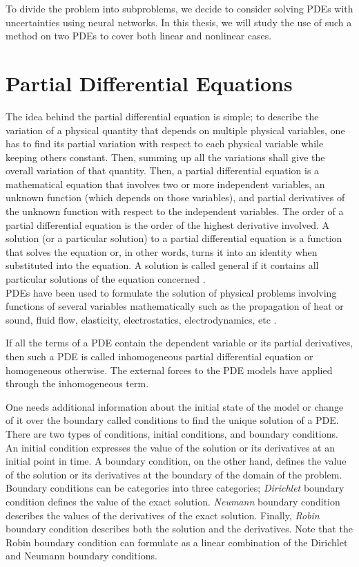 To divide the problem into subproblems, we decide to consider solving PDEs with uncertainties using neural networks. In this thesis, we will study the use of such a method on two PDEs to cover both linear and nonlinear cases.

\section{Partial Differential Equations}
\label{sec:PDE}
The idea behind the partial differential equation is simple; to describe the variation of a physical quantity that depends on multiple physical variables, one has to find its partial variation with respect to each physical variable while keeping others constant. Then, summing up all the variations shall give the overall variation of that quantity. Then, a partial differential equation is a mathematical equation that involves two or more independent variables, an unknown function (which depends on those variables), and partial derivatives of the unknown function with respect to the independent variables. The order of a partial differential equation is the order of the highest derivative involved. A solution (or a particular solution) to a partial differential equation is a function that solves the equation or, in other words, turns it into an identity when substituted into the equation. A solution is called general if it contains all particular solutions of the equation concerned \cite{stavroulakis1999partial}.\\
PDEs have been used  to formulate the solution of physical problems involving functions of several variables mathematically such as the propagation of heat or sound, fluid flow, elasticity, electrostatics, electrodynamics, etc \cite{stavroulakis1999partial}.

If all the terms of a PDE contain the dependent variable or its partial derivatives, then such a PDE is called inhomogeneous partial differential equation or homogeneous otherwise. The external forces to the PDE models have applied through the inhomogeneous term.

One needs additional information about the initial state of the model or change of it over the boundary called conditions to find the unique solution of a PDE. 
There are two types of conditions, initial conditions, and boundary conditions. An initial condition expresses the value of the solution or its derivatives at an initial point in time. A boundary condition, on the other hand, defines the value of the solution or its derivatives at the boundary of the domain of the problem.\\
Boundary conditions can be categories into three categories; \textit{Dirichlet} boundary condition defines the value of the exact solution.  \textit{Neumann} boundary condition describes the values of the derivatives of the exact solution. Finally, \textit{Robin} boundary condition describes both the solution and the derivatives. Note that the Robin boundary condition can formulate as a linear combination of the Dirichlet and Neumann boundary conditions. 
